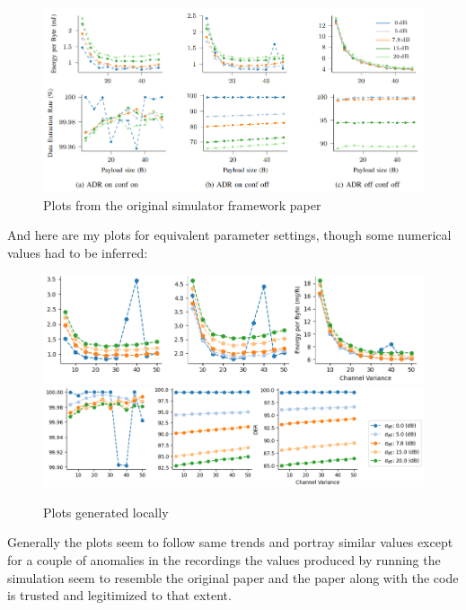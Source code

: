 \begin{figure}[h]
\centering
\includegraphics[scale=0.6]{figures/original_plots.PNG}
  \caption{Plots from the original simulator framework paper \cite{simulator}}
  \label{fig:my_sectors}
\end{figure}

And here are my plots for equivalent parameter settings, though
some numerical values had to be inferred:

\begin{figure}[h]
\centering
\includegraphics[scale=0.5]{figures/my_plots_1.PNG}\\
\hspace*{1.3cm}  
\includegraphics[scale=0.5]{figures/my_plots_2.PNG}
  \caption{Plots generated locally}
  \label{fig:my_sectors}
\end{figure}

Generally the plots seem to follow same trends and portray 
similar values except for a couple of anomalies in the
recordings the values produced by running the simulation
seem to resemble the original paper and the paper along with
the code is trusted and legitimized to that extent. 

